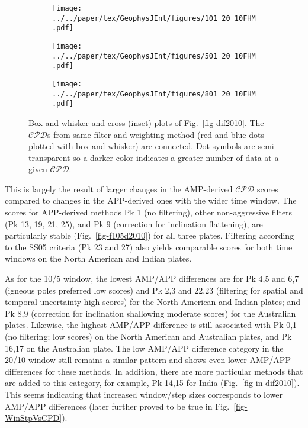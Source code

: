 \begin{figure}
  \centering
  \begin{subfigure}{1\textwidth}
    \texttt{[image: ../../paper/tex/GeophysJInt/figures/101\_20\_10FHM.pdf]}
    \caption{}\label{fig-na-boxAMPvsAPP2010}
  \end{subfigure}
  \vspace{.1em}
  \begin{subfigure}{1\textwidth}
    \texttt{[image: ../../paper/tex/GeophysJInt/figures/501\_20\_10FHM.pdf]}
    \caption{}\label{fig-in-boxAMPvsAPP2010}
  \end{subfigure}
  \vspace{.1em}
  \begin{subfigure}{1\textwidth}
    \texttt{[image: ../../paper/tex/GeophysJInt/figures/801\_20\_10FHM.pdf]}
    \caption{}\label{fig-au-boxAMPvsAPP2010}
  \end{subfigure}
  \caption[]{Box-and-whisker and cross (inset) plots of Fig.~\ref{fig-dif2010}.
The $\mathcal{CPD}$s from same filter and weighting method (red and blue dots
plotted with box-and-whisker) are connected. Dot symbols are semi-transparent so
a darker color indicates a greater number of data at a given
$\mathcal{CPD}$.}\label{fig-boxAMPvsAPP2010}
\end{figure}

This is largely the result of larger changes in the AMP-derived $\mathcal{CPD}$
scores compared to changes in the APP-derived ones with the wider time window.
The scores for APP-derived methods Pk 1 (no filtering), other non-aggressive
filters (Pk 13, 19, 21, 25), and Pk 9 (correction for inclination flattening),
are particularly stable (Fig.~\ref{fig-f105d2010}) for all three plates.
Filtering according to the SS05 criteria (Pk 23 and 27) also yields comparable
scores for both time windows on the North American and Indian plates.

As for the 10/5 window, the lowest AMP/APP differences are for Pk 4,5 and 6,7
(igneous poles preferred \textendash{} low scores) and Pk 2,3 and 22,23
(filtering for spatial and temporal uncertainty \textendash{} high scores) for
the North American and Indian plates; and Pk 8,9 (correction for inclination
shallowing \textendash{} moderate scores) for the Australian plates. Likewise,
the highest AMP/APP difference is still associated with Pk 0,1 (no filtering;
low scores) on the North American and Australian plates, and Pk 16,17 on the
Australian plate. The low AMP/APP difference category in the 20/10 window still
remains a similar pattern and shows even lower AMP/APP differences for these
methods. In addition, there are more particular methods that are added to this
category, for example, Pk 14,15 for India (Fig.~\ref{fig-in-dif2010}). This
seems indicating that increased window/step sizes corresponds to lower AMP/APP
differences (later further proved to be true in Fig.~\ref{fig-WinStpVsCPD}).

